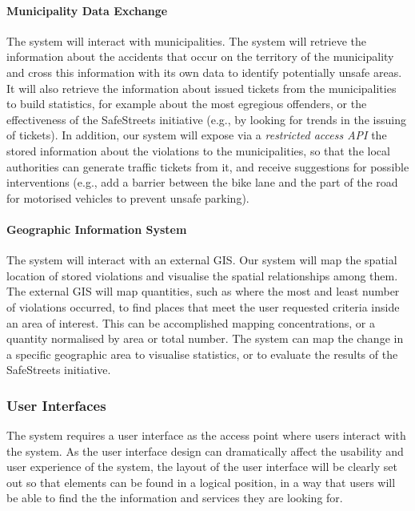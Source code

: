 \paragraph{Municipality Data Exchange} The system will interact with municipalities. The system will retrieve the information about the accidents that occur on the territory of the municipality and cross this information with its own data to identify potentially unsafe areas. It will also retrieve the information about issued tickets from the municipalities to build statistics, for example about the most egregious offenders, or the effectiveness of the SafeStreets initiative (e.g., by looking for trends in the issuing of tickets). In addition, our system will expose via a \emph{restricted access API} the stored information about the violations to the municipalities, so that the local authorities can generate traffic tickets from it, and receive suggestions for possible interventions (e.g., add a barrier between the bike lane and the part of the road for motorised vehicles to prevent unsafe parking). \cite{Assignments}


\label{gis}	
\paragraph{Geographic Information System} The system will interact with an external GIS. Our system will map the spatial location of stored violations and visualise the spatial relationships among them. The external GIS will map quantities, such as where the most and least number of violations occurred, to find places that meet the user requested criteria inside an area of interest. This can be accomplished mapping concentrations, or a quantity normalised by area or total number. The system can map the change in a specific geographic area to visualise statistics, or to evaluate the results of the SafeStreets initiative.	

\subsubsection{User Interfaces}

The system requires a user interface as the access point where users interact with the system. As the user interface design can dramatically affect the usability and user experience of the system, the layout of the user interface will be clearly set out so that elements can be found in a logical position, in a way that users will be able to find the the information and services they are looking for.

